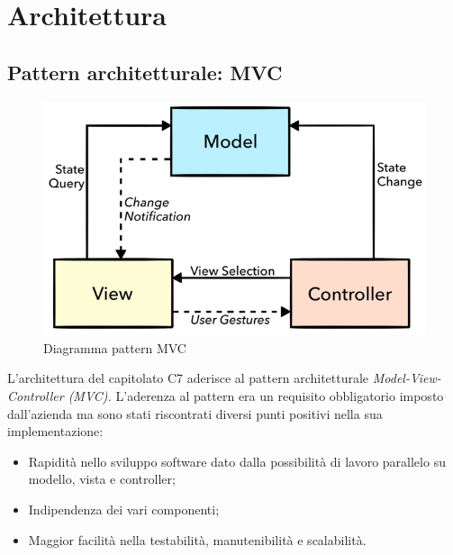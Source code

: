 \section{Architettura}
\subsection{Pattern architetturale: MVC}
\begin{figure}[H]
    \centering
    \includegraphics[scale = 1]{components/img/mvc-generico.png}
    \caption{Diagramma pattern MVC}
    \label{fig:diagramma MVC generico}
\end{figure}
L'architettura del capitolato C7 aderisce al pattern architetturale \textit{Model-View-Controller (MVC).} L'aderenza al pattern era un requisito obbligatorio imposto dall'azienda ma sono stati riscontrati diversi punti positivi nella sua implementazione:

\begin{itemize}
	\item Rapidità nello sviluppo software dato dalla possibilità di lavoro parallelo su modello, vista e controller;
	\item Indipendenza dei vari componenti;
	\item Maggior facilità nella testabilità, manutenibilità e scalabilità.

\end{itemize}
